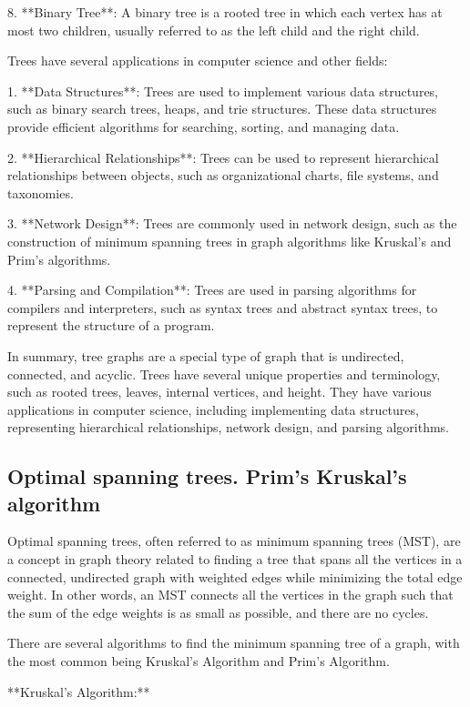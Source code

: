 \documentclass{article}
\begin{document}
8. **Binary Tree**: A binary tree is a rooted tree in which each vertex has at most two children, usually referred to as the left child and the right child.

Trees have several applications in computer science and other fields:

1. **Data Structures**: Trees are used to implement various data structures, such as binary search trees, heaps, and trie structures. These data structures provide efficient algorithms for searching, sorting, and managing data.

2. **Hierarchical Relationships**: Trees can be used to represent hierarchical relationships between objects, such as organizational charts, file systems, and taxonomies.

3. **Network Design**: Trees are commonly used in network design, such as the construction of minimum spanning trees in graph algorithms like Kruskal's and Prim's algorithms.

4. **Parsing and Compilation**: Trees are used in parsing algorithms for compilers and interpreters, such as syntax trees and abstract syntax trees, to represent the structure of a program.

In summary, tree graphs are a special type of graph that is undirected, connected, and acyclic. Trees have several unique properties and terminology, such as rooted trees, leaves, internal vertices, and height. They have various applications in computer science, including implementing data structures, representing hierarchical relationships, network design, and parsing algorithms.


\subsection{Optimal spanning trees. Prim’s Kruskal’s algorithm}

Optimal spanning trees, often referred to as minimum spanning trees (MST), are a concept in graph theory related to finding a tree that spans all the vertices in a connected, undirected graph with weighted edges while minimizing the total edge weight. In other words, an MST connects all the vertices in the graph such that the sum of the edge weights is as small as possible, and there are no cycles.

There are several algorithms to find the minimum spanning tree of a graph, with the most common being Kruskal's Algorithm and Prim's Algorithm.

**Kruskal's Algorithm:**
\end{document}
